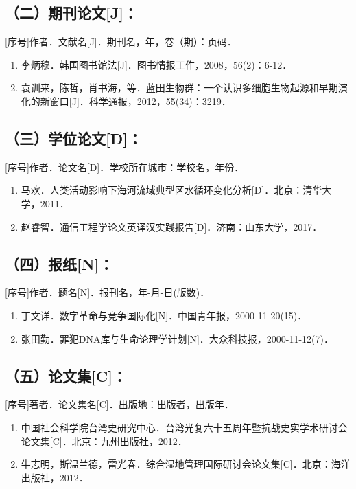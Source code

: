 \subsection{（二）期刊论文[J]：}
[序号]作者．文献名[J]．期刊名，年，卷（期）：页码．

\begin{enumerate}
\item[1] 李炳穆．韩国图书馆法[J]．图书情报工作，2008，56(2)：6-12．
\item[2] 袁训来，陈哲，肖书海，等．蓝田生物群：一个认识多细胞生物起源和早期演化的新窗口[J]．科学通报，2012，55(34)：3219．
\end{enumerate}

\subsection{（三）学位论文[D]：}
[序号]作者．论文名[D]．学校所在城市：学校名，年份．

\begin{enumerate}
\item[1] 马欢．人类活动影响下海河流域典型区水循环变化分析[D]．北京：清华大学，2011．
\item[2] 赵睿智．通信工程学论文英译汉实践报告[D]．济南：山东大学，2017．
\end{enumerate}

\subsection{（四）报纸[N]：}
[序号]作者．题名[N]．报刊名，年-月-日(版数)．

\begin{enumerate}
\item[1] 丁文详．数字革命与竞争国际化[N]．中国青年报，2000-11-20(15)．
\item[2] 张田勤．罪犯DNA库与生命论理学计划[N]．大众科技报，2000-11-12(7)．
\end{enumerate}

\subsection{（五）论文集[C]：}
[序号]著者．论文集名[C]．出版地：出版者，出版年．

\begin{enumerate}
\item[1] 中国社会科学院台湾史研究中心．台湾光复六十五周年暨抗战史实学术研讨会论文集[C]．北京：九州出版社，2012．
\item[2] 牛志明，斯温兰德，雷光春．综合湿地管理国际研讨会论文集[C]．北京：海洋出版社，2012．
\end{enumerate}

